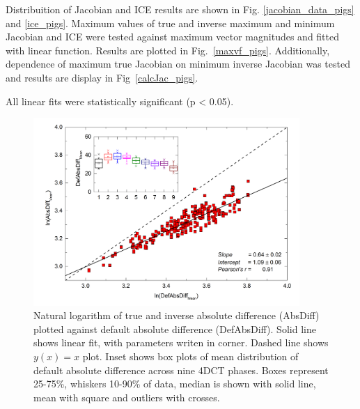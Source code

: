 \documentclass[type=dr, dr=rernat, accentcolor=tud7b,colorbacktitle, bigchapter, openright, twoside, 12pt ]{tudthesis}
\begin{document}
Distribuition of Jacobian and ICE results are shown in Fig. \ref{jacobian_data_pigs} and \ref{ice_pigs}. Maximum values of true and inverse maximum and minimum Jacobian and ICE were tested 
against maximum vector magnitudes and fitted with linear function. Results are plotted in Fig.~\ref{maxvf_pigs}.
Additionally, dependence of maximum true Jacobian on minimum inverse Jacobian was tested and results are display in Fig~\ref{calcJac_pigs}.

All linear fits were statistically significant (p < 0.05).

\begin{figure}[H]
	\begin{center}		
		\includegraphics[width=0.9\textwidth]{./Images/AbsDiff_pigs.png}
		\caption{Natural logarithm of true and inverse absolute difference (AbsDiff) plotted against default absolute difference (DefAbsDiff). Solid line shows linear fit, with parameters
		writen in corner. Dashed line shows $y(x)=x$ plot. Inset shows box plots of mean distribution of default absolute difference across nine 4DCT phases. Boxes represent 25-75\%, whiskers 10-90\%
		of data, median is shown with solid line, mean with square and outliers with crosses.}
		\label{absDiff_pigs}
	\end{center}
\end{figure}


\newpage
\end{document}
